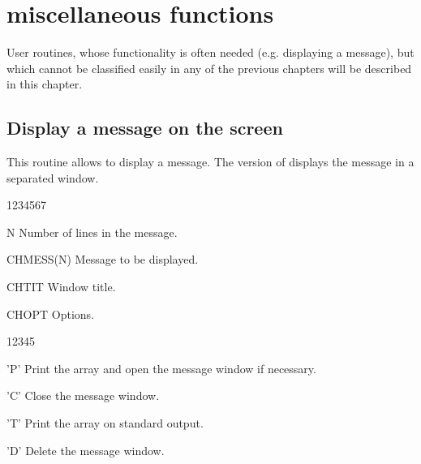 \chapter{miscellaneous functions}

User routines, whose functionality is often needed (e.g. displaying a message),
but which cannot be classified easily in any of the previous chapters will be
described in this chapter.

\section{Display a message on the screen}
\Action
This routine allows to display a message. The  version of \HIGZ{} displays
the message in a separated window.
\Pdesc
\begin{DLtt}{1234567}
\item[N] Number of lines in the message.
\item[CHMESS(N)] Message to be displayed.
\item[CHTIT] Window title.
\item[CHOPT] Options.
\begin{DLtt}{12345}
\item['P'] Print the array  and open the message window
if necessary.
\item['C'] Close the message window.
\item['T'] Print the array  on standard output.
\item['D'] Delete the message window.
\end{DLtt}
\end{DLtt}
